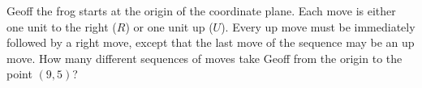 Geoff the frog starts at the origin of the coordinate plane. Each move is either one unit to the right ($R$) or one unit up ($U$). Every up move must be immediately followed by a right move, except that the last move of the sequence may be an up move. How many different sequences of moves take Geoff from the origin to the point $(9,5)$?
